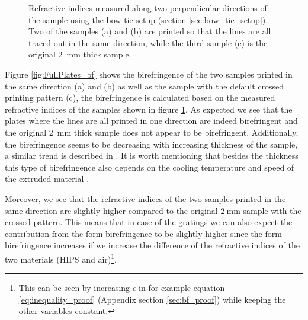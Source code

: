 \begin{figure}[H]
\begin{subfigure}[b]{.33\linewidth}
    \end{subfigure}
    \caption{Refractive indices measured along two perpendicular directions of the sample using the bow-tie setup (section \ref{sec:bow_tie_setup}). Two of the samples (a) and (b) are printed so that the lines are all traced out in the same direction, while the third sample (c) is the original \SI{2}{\milli \meter} thick sample.}
    \label{fig:ri_fullplates}
\end{figure}

Figure \ref{fig:FullPlates_bf} shows the birefringence of the two samples printed in the same direction (a) and (b) as well as the sample with the default crossed printing pattern (c), the birefringence is calculated based on the measured refractive indices of the samples shown in figure \ref{fig:ri_fullplates}. As expected we see that the plates where the lines are all printed in one direction are indeed birefringent and the original \SI{2}{\milli \meter} thick sample does not appear to be birefringent. Additionally, the birefringence seems to be decreasing with increasing thickness of the sample, a similar trend is described in \cite{Solr-urn:nbn:de:hebis:04-z2017-0786}. It is worth mentioning that besides the thickness this type of birefringence also depends on the cooling temperature and speed of the extruded material \cite{Solr-urn:nbn:de:hebis:04-z2017-0786}.

Moreover, we see that the refractive indices of the two samples printed in the same direction are slightly higher compared to the original $\SI{2}{\milli \meter}$ sample with the crossed pattern. This means that in case of the gratings we can also expect the contribution from the form birefringence to be slightly higher since the form birefringence increases if we increase the difference of the refractive indices of the two materials (HIPS and air)\footnote{This can be seen by increasing $\epsilon$ in for example equation \ref{eq:inequality_proof} (Appendix section \ref{sec:bf_proof}) while keeping the other variables constant.}.

